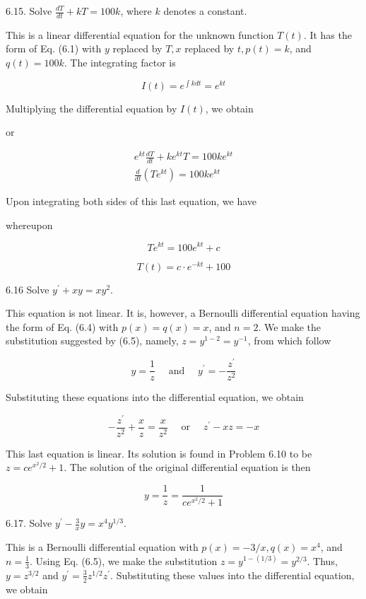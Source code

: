 \documentclass[10pt]{article}
\begin{document}
6.15. Solve $\frac{d T}{d t}+k T=100 k$, where $k$ denotes a constant.

This is a linear differential equation for the unknown function $T(t)$. It has the form of Eq. (6.1) with $y$ replaced by $T, x$ replaced by $t, p(t)=k$, and $q(t)=100 k$. The integrating factor is

$$
I(t)=e^{\int k d t}=e^{k t}
$$

Multiplying the differential equation by $I(t)$, we obtain

or

$$
\begin{gathered}
e^{k t} \frac{d T}{d t}+k e^{k t} T=100 k e^{k t} \\
\frac{d}{d t}\left(T e^{k t}\right)=100 k e^{k t}
\end{gathered}
$$

Upon integrating both sides of this last equation, we have

whereupon

$$
T e^{k t}=100 e^{k t}+c
$$

$$
T(t)=c \cdot e^{-k t}+100
$$

6.16 Solve $y^{\prime}+x y=x y^{2}$.

This equation is not linear. It is, however, a Bernoulli differential equation having the form of Eq. (6.4) with $p(x)=q(x)=x$, and $n=2$. We make the substitution suggested by (6.5), namely, $z=y^{1-2}=y^{-1}$, from which follow

$$
y=\frac{1}{z} \quad \text { and } \quad y^{\prime}=-\frac{z^{\prime}}{z^{2}}
$$

Substituting these equations into the differential equation, we obtain

$$
-\frac{z^{\prime}}{z^{2}}+\frac{x}{z}=\frac{x}{z^{2}} \quad \text { or } \quad z^{\prime}-x z=-x
$$

This last equation is linear. Its solution is found in Problem 6.10 to be $z=c e^{x^{2} / 2}+1$. The solution of the original differential equation is then

$$
y=\frac{1}{z}=\frac{1}{c e^{x^{2} / 2}+1}
$$

6.17. Solve $y^{\prime}-\frac{3}{x} y=x^{4} y^{1 / 3}$.

This is a Bernoulli differential equation with $p(x)=-3 / x, q(x)=x^{4}$, and $n=\frac{1}{3}$. Using Eq. (6.5), we make the substitution $z=y^{1-(1 / 3)}=y^{2 / 3}$. Thus, $y=z^{3 / 2}$ and $y^{\prime}=\frac{3}{2} z^{1 / 2} z^{\prime}$. Substituting these values into the differential equation, we obtain
\end{document}
